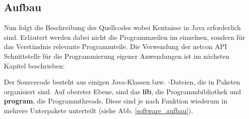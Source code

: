 \documentclass[a4paper,14pt,headsepline]{scrartcl}
\begin{document}
\begin{figure}[h]
\begin{center}
\end{center}
\end{figure}
\newpage

\subsection{Aufbau}

Nun folgt die Beschreibung des Quellcodes wobei Kentnisse in Java erforderlich sind. Erläutert werden dabei nicht die Programmzeilen im einzelnen, sondern für das Verständnis relevante Programmteile. Die Verwendung der netcon API Schnittstelle für die Programmierung eigener Anwendungen ist im nächsten Kapitel beschrieben: 

Der Sourcecode besteht aus einigen Java-Klassen bzw. -Dateien, die in Paketen organisiert sind. Auf oberster Ebene, sind das \textbf{lib}, die Programmbibliothek und \textbf{program}, die Programmthreads. Diese sind je nach Funktion wiederum in mehrere Unterpakete unterteilt (siehe Abb. \ref{software_aufbau}).
\end{document}
